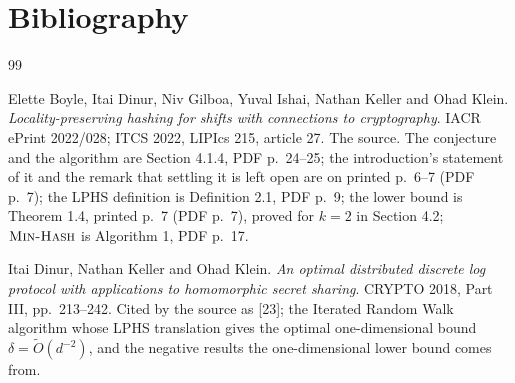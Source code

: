 \documentclass{conjura-conjecture}
\newcommand{\Ot}{\widetilde{O}}
\newcommand{\MinHash}{\textsc{Min-Hash}}
\begin{document}
\section{Bibliography}

\begin{conjurabibliography}{99}

Elette Boyle, Itai Dinur, Niv Gilboa, Yuval Ishai, Nathan Keller and
Ohad Klein.
\emph{Locality-preserving hashing for shifts with connections to
cryptography}.
IACR ePrint 2022/028; ITCS 2022, LIPIcs 215, article 27.
The source. The conjecture and the algorithm are Section 4.1.4, PDF
p.\ 24--25; the introduction's statement of it and the remark that
settling it is left open are on printed p.\ 6--7 (PDF p.\ 7); the LPHS
definition is Definition 2.1, PDF p.\ 9; the lower bound is
Theorem 1.4, printed p.\ 7 (PDF p.\ 7), proved for $k = 2$ in
Section 4.2; $\MinHash$ is Algorithm 1, PDF p.\ 17.

Itai Dinur, Nathan Keller and Ohad Klein.
\emph{An optimal distributed discrete log protocol with applications to
homomorphic secret sharing}.
CRYPTO 2018, Part III, pp.\ 213--242.
Cited by the source as [23]; the Iterated Random Walk algorithm whose
LPHS translation gives the optimal one-dimensional bound
$\delta = \Ot(d^{-2})$, and the negative results the one-dimensional
lower bound comes from.

\end{conjurabibliography}
\end{document}
